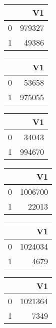 \bigskip\bigskip
\centering
\begin{tabular}{rr}
  \hline
 & V1 \\ 
  \hline
0 & 979327 \\ 
  1 & 49386 \\ 
   \hline
\end{tabular}

\bigskip\bigskip
\centering
\begin{tabular}{rr}
  \hline
 & V1 \\ 
  \hline
0 & 53658 \\ 
  1 & 975055 \\ 
   \hline
\end{tabular}

\bigskip\bigskip
\centering
\begin{tabular}{rr}
  \hline
 & V1 \\ 
  \hline
0 & 34043 \\ 
  1 & 994670 \\ 
   \hline
\end{tabular}

\bigskip\bigskip
\centering
\begin{tabular}{rr}
  \hline
 & V1 \\ 
  \hline
0 & 1006700 \\ 
  1 & 22013 \\ 
   \hline
\end{tabular}

\bigskip\bigskip
\centering
\begin{tabular}{rr}
  \hline
 & V1 \\ 
  \hline
0 & 1024034 \\ 
  1 & 4679 \\ 
   \hline
\end{tabular}

\bigskip\bigskip
\centering
\begin{tabular}{rr}
  \hline
 & V1 \\ 
  \hline
0 & 1021364 \\ 
  1 & 7349 \\ 
   \hline
\end{tabular}

